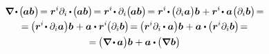 \begin{otherlanguage}{russian}
\nopagebreak\vspace{-0.3em}\begin{multline}\label{divergenceofdyadicproducoftwovectors}
\boldnabla \hspace{-0.16ex} \dotp \hspace{-0.2ex} \bigl( \hspace{-0.1ex} \bm{a} \bm{b} \hspace{.05ex} \bigr) \hspace{-0.33ex}
= \bm{r}^i \partial_i \hspace{-0.1ex} \dotp \hspace{-0.24ex} \bigl( \hspace{-0.1ex} \bm{a} \bm{b} \bigr) \hspace{-0.33ex}
= \bm{r}^i \hspace{-0.3ex} \dotp \partial_i \bigl( \hspace{-0.1ex} \bm{a} \bm{b} \bigr) \hspace{-0.3ex}
= \bm{r}^i \hspace{-0.3ex} \dotp \hspace{-0.15ex} \bigl( \partial_i \bm{a} \bigr) \bm{b} \hspace{.1ex} + \bm{r}^i \hspace{-0.3ex} \dotp \bm{a} \hspace{.1ex} \bigl( \partial_i \bm{b} \bigr) \hspace{-0.33ex} =
\\[-0.1em]
%
= \hspace{-0.15ex} \bigl( \bm{r}^i \hspace{-0.3ex} \dotp \partial_i \bm{a} \bigr) \bm{b}  \hspace{.1ex} + \bm{a} \dotp \bm{r}^i \hspace{-0.15ex} \bigl( \partial_i \bm{b} \bigr) \hspace{-0.33ex}
= \hspace{-0.15ex} \bigl( \bm{r}^i \partial_i \hspace{-0.1ex} \dotp \bm{a} \bigr) \bm{b}  \hspace{.1ex} + \bm{a} \dotp \hspace{-0.1ex} \bigl( \bm{r}^i \partial_i \bm{b} \bigr) \hspace{-0.33ex} =
\\
%
= \hspace{-0.15ex} \bigl( \boldnabla \hspace{-0.16ex} \dotp \hspace{-0.1ex} \bm{a} \bigr) \bm{b} \hspace{.1ex} + \bm{a} \dotp \hspace{-0.12ex} \bigl( \boldnabla \hspace{.1ex} \bm{b} \bigr)
\end{multline}


\end{otherlanguage}
